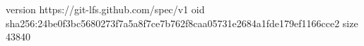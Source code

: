 version https://git-lfs.github.com/spec/v1
oid sha256:24be0f3bc5680273f7a5a8f7ce7b762f8caa05731e2684a1fde179ef1166cce2
size 43840
